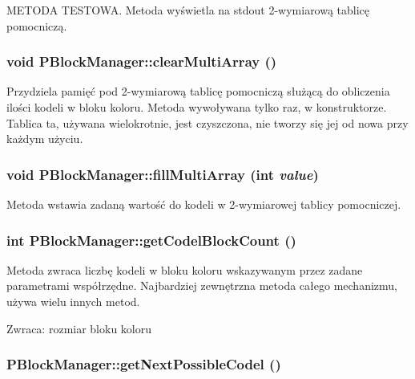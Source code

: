 METODA TESTOWA. Metoda wyświetla na stdout 2-wymiarową tablicę pomocniczą. \hypertarget{classPBlockManager_ab82616c7ee28fa12d4cfec944f550a0}{
\subsubsection[{clearMultiArray}]{\setlength{\rightskip}{0pt plus 5cm}void PBlockManager::clearMultiArray ()}}
\label{classPBlockManager_ab82616c7ee28fa12d4cfec944f550a0}


Przydziela pamięć pod 2-wymiarową tablicę pomocniczą służącą do obliczenia ilości kodeli w bloku koloru. Metoda wywoływana tylko raz, w konstruktorze. Tablica ta, używana wielokrotnie, jest czyszczona, nie tworzy się jej od nowa przy każdym użyciu. \hypertarget{classPBlockManager_c31dc0993286be444a82ae5e51f32415}{
\subsubsection[{fillMultiArray}]{\setlength{\rightskip}{0pt plus 5cm}void PBlockManager::fillMultiArray (int {\em value})}}
\label{classPBlockManager_c31dc0993286be444a82ae5e51f32415}


Metoda wstawia zadaną wartość do kodeli w 2-wymiarowej tablicy pomocniczej. \hypertarget{classPBlockManager_ba7919eedd6b806f2f4da408423723ea}{
\subsubsection[{getCodelBlockCount}]{\setlength{\rightskip}{0pt plus 5cm}int PBlockManager::getCodelBlockCount ()}}
\label{classPBlockManager_ba7919eedd6b806f2f4da408423723ea}


Metoda zwraca liczbę kodeli w bloku koloru wskazywanym przez zadane parametrami współrzędne. Najbardziej zewnętrzna metoda całego mechanizmu, używa wielu innych metod. \begin{Desc}
\item[Zwraca:]rozmiar bloku koloru \end{Desc}
\hypertarget{classPBlockManager_667f3673eda6cf4476ecb34d01db665b}{
\subsubsection[{getNextPossibleCodel}]{ PBlockManager::getNextPossibleCodel ()}}
\label{classPBlockManager_667f3673eda6cf4476ecb34d01db665b}


